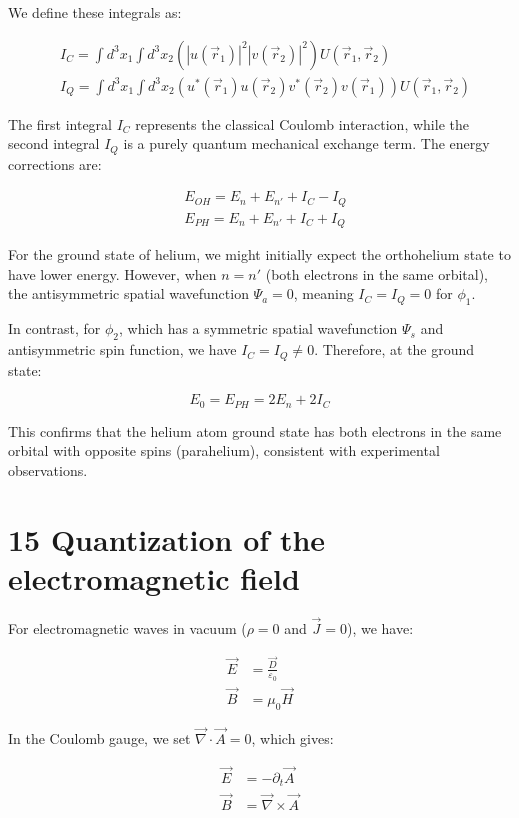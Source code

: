 \documentclass[italian]{HKNdocument}
\begin{document}
We define these integrals as:

\begin{align*}
&I_C=\int d^3x_1\int d^3x_2(|u(\vec{r}_1)|^2|v(\vec{r}_2)|^2)U(\vec{r}_1,\vec{r}_2)\\
&I_Q=\int d^3x_1\int d^3x_2(u^*(\vec{r}_1)u(\vec{r}_2)v^*(\vec{r}_2)v(\vec{r}_1))U(\vec{r}_1,\vec{r}_2) \tag{14.45}
\end{align*}

The first integral $I_C$ represents the classical Coulomb interaction, while the second integral $I_Q$ is a purely quantum mechanical exchange term. The energy corrections are:

\begin{align*}
&E_{OH}=E_n+E_{n'}+I_C-I_Q\\
&E_{PH}=E_n+E_{n'}+I_C+I_Q \tag{14.46}
\end{align*}


For the ground state of helium, we might initially expect the orthohelium state to have lower energy. However, when $n=n'$ (both electrons in the same orbital), the antisymmetric spatial wavefunction $\Psi_a=0$, meaning $I_C=I_Q=0$ for $\phi_1$.

In contrast, for $\phi_2$, which has a symmetric spatial wavefunction $\Psi_s$ and antisymmetric spin function, we have $I_C=I_Q\neq 0$. Therefore, at the ground state:

\begin{equation*}
E_0=E_{PH}=2E_n+2I_C \tag{14.47}
\end{equation*}

This confirms that the helium atom ground state has both electrons in the same orbital with opposite spins (parahelium), consistent with experimental observations.

\section*{15 Quantization of the electromagnetic field}
For electromagnetic waves in vacuum ($\rho=0$ and $\vec{J}=0$), we have:

\begin{align*}
\vec{E}&=\frac{\vec{D}}{\varepsilon_0} \tag{15.1}\\
\vec{B}&=\mu_0\vec{H}
\end{align*}

In the Coulomb gauge, we set $\vec{\nabla}\cdot\vec{A}=0$, which gives:

\begin{align*}
\vec{E}&=-\partial_t\vec{A}\\
\vec{B}&=\vec{\nabla}\times\vec{A} \tag{15.2}
\end{align*}
\end{document}
